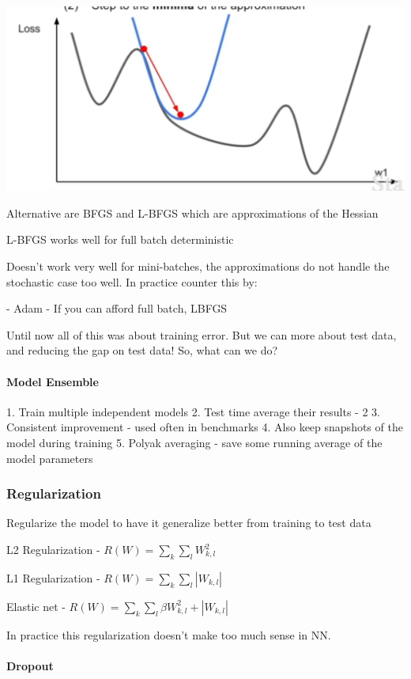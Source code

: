 \includegraphics[width=0.5\columnwidth]{fei_fei_li/lecture_07/second_order_approx.png}

Alternative are BFGS and L-BFGS which are approximations of the Hessian

L-BFGS works well for full batch deterministic 

Doesn't work very well for mini-batches, the approximations do not handle the stochastic case too well. In practice counter this by:

- Adam
- If you can afford full batch, LBFGS

Until now all of this was about training error. But we can more about test data, and reducing the gap on test data! So, what can we do? 

\paragraph{Model Ensemble}

1. Train multiple independent models
2. Test time average their results - 2%
3. Consistent improvement - used often in benchmarks
4. Also keep snapshots of the model during training
5. Polyak averaging - save some running average of the model parameters

\subsubsection{Regularization}

Regularize the model to have it generalize better from training to test data

L2 Regularization - $R(W) = \sum_k\sum_lW_{k,l}^2 $

L1 Regularization - $R(W) = \sum_k\sum_l | W_{k,l} |$

Elastic net - $R(W) = \sum_k \sum_l \beta W^2_{k,l} + | W_{k,l} |$

In practice this regularization doesn't make  too much sense in NN.

\paragraph{	Dropout }

